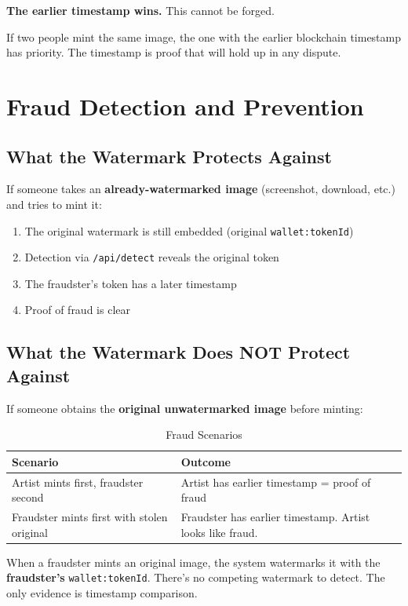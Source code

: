 \documentclass[11pt,a4paper]{article}
\newcommand{\code}[1]{\texttt{#1}}
\begin{document}
\textbf{The earlier timestamp wins.} This cannot be forged.

If two people mint the same image, the one with the earlier blockchain timestamp has priority. The timestamp is proof that will hold up in any dispute.

\newpage
\section{Fraud Detection and Prevention}

\subsection{What the Watermark Protects Against}

If someone takes an \textbf{already-watermarked image} (screenshot, download, etc.) and tries to mint it:

\begin{enumerate}
    \item The original watermark is still embedded (original \code{wallet:tokenId})
    \item Detection via \code{/api/detect} reveals the original token
    \item The fraudster's token has a later timestamp
    \item Proof of fraud is clear
\end{enumerate}

\subsection{What the Watermark Does NOT Protect Against}

If someone obtains the \textbf{original unwatermarked image} before minting:

\begin{table}[h]
\centering
\begin{tabular}{@{}L{5cm}L{7cm}@{}}
\toprule
\textbf{Scenario} & \textbf{Outcome} \\
\midrule
Artist mints first, fraudster second & Artist has earlier timestamp = proof of fraud \\
Fraudster mints first with stolen original & Fraudster has earlier timestamp. Artist looks like fraud. \\
\bottomrule
\end{tabular}
\caption{Fraud Scenarios}
\end{table}

When a fraudster mints an original image, the system watermarks it with the \textbf{fraudster's} \code{wallet:tokenId}. There's no competing watermark to detect. The only evidence is timestamp comparison.
\end{document}
